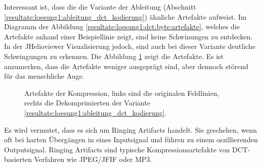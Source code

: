 Interessant ist, dass die die Variante der Ableitung (Abschnitt \ref{resultate:loesung1:ableitung_dct_kodierung}) ähnliche Artefakte aufweist. Im Diagramm der Abbildung \ref{resultate:loesung1:dct:byte:artefakte}, welches die Artefakte anhand einer Beispiellinie zeigt, sind keine Schwinungen zu entdecken. In der JHelioviewer Visualisierung jedoch, sind auch bei dieser Variante deutliche Schwingungen zu erkennen. Die Abbildung \ref{resultate:loesung1:dct:randbehandlung:jvhartefakte_loesung6} zeigt die Artefakte. Es ist anzumerken, dass die Artefakte weniger ausgeprägt sind, aber dennoch störend für das menschliche Auge.\\
\begin{figure}[!htbp]
	\center
	\caption{Artefakte der Kompression, links sind die originalen Feldlinien, rechts die Dekomprimierten der Variante \ref{resultate:loesung1:ableitung_dct_kodierung}.}
	\label{resultate:loesung1:dct:randbehandlung:jvhartefakte_loesung6}
\end{figure} 
Es wird vermutet, dass es sich um Ringing Artifacts \cite{wiki:ringing:artefacts} handelt. 
Sie geschehen, wenn oft bei harten Übergängen in eines Inputsignal und führen zu einem oszillierenden Outputsignal. Ringing Artifacts sind typische Kompressionsartefakte von DCT-basierten Verfahren wie JPEG/JFIF oder MP3.\\
